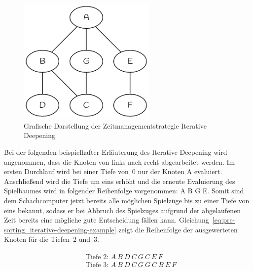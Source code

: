 \begin{figure}[H]
    \centering
    \includegraphics[width=0.6\textwidth]{images/theory/pre-sorting_iterative-deepening.png}
    \caption[Grafische Darstellung der Zeitmanagementstrategie Iterative Deepening]{Grafische Darstellung der Zeitmanagementstrategie Iterative Deepening}
    \label{fig:pre-sorting_iterative-deepening}
\end{figure}

\noindent Bei der folgenden beispielhafter Erläuterung des Iterative Deepening wird angenommen, dass die Knoten von links nach recht abgearbeitet werden.
Im ersten Durchlauf wird bei einer Tiefe von~0 nur der Knoten A evaluiert.
Anschließend wird die Tiefe um eins erhöht und die erneute Evaluierung des Spielbaumes wird in folgender Reihenfolge vorgenommen: A B G E.
Somit sind dem Schachcomputer jetzt bereits alle möglichen Spielzüge bis zu einer Tiefe von eins bekannt, sodass er bei Abbruch des Spielzuges aufgrund der abgelaufenen Zeit bereits eine mögliche gute Entscheidung fällen kann.
Gleichung~\ref{eq:pre-sorting_iterative-deepening-example} zeigt die Reihenfolge der ausgewerteten Knoten für die Tiefen~2 und~3.

\begin{align} \label{eq:pre-sorting_iterative-deepening-example}
\begin{split}
    & \text{Tiefe 2: } A\ B\ D\ C\ G\ C\ E\ F\\
    & \text{Tiefe 3: } A\ B\ D\ C\ G\ G\ C\ B\ E\ F
\end{split}
\end{align}
